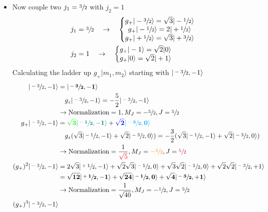\documentclass[../main.tex]{subfiles}
\begin{document}
\begin{itemize}
\item Now couple two $j_1=\sfrac{3}{2}$ with $j_2=1$
\begin{align}
j_1&=\sfrac{3}{2}\quad\rightarrow\quad\left\{\begin{matrix}
g_+|-\sfrac{3}{2}\rangle=\sqrt{3}|-\sfrac{1}{2}\rangle\\
g_+|-\sfrac{1}{2}\rangle=2|+\sfrac{1}{2}\rangle\\
g_+|+\sfrac{1}{2}\rangle=\sqrt{3}|+\sfrac{3}{2}\rangle
\end{matrix}\right.\\
j_2&=1\quad\rightarrow\quad\left\{\begin{matrix}
g_+|-1\rangle=\sqrt{2}|0\rangle\\
g_+|0\rangle=\sqrt{2}|+1\rangle\\
\end{matrix}\right.\\
\end{align}
Calculating the ladder up $g_+|m_1,m_2\rangle$ starting with $|\sfrac{-3}{2},-1\rangle$
\begin{align}
|\sfrac{-3}{2},-1\rangle 
&= \mathbf{|\sfrac{-3}{2},-1\rangle}\\
&\quad g_z|\sfrac{-3}{2},-1\rangle=-\frac{5}{2}|\sfrac{-3}{2},-1\rangle\\
&\rightarrow \text{Normalization}=1,M_J=-\sfrac{5}{2},J=\sfrac{5}{2}\\
%
g_+|\sfrac{-3}{2},-1\rangle 
&= \mathbf{\textcolor{green}{\sqrt{3}}\textcolor{teal}{|\sfrac{-1}{2},-1\rangle} +\textcolor{blue}{\sqrt{2}}\textcolor{cyan}{|\sfrac{-3}{2},0\rangle}}\\
&\quad g_z(\sqrt{3}|\sfrac{-1}{2},-1\rangle +\sqrt{2}|\sfrac{-3}{2},0\rangle)=-\frac{3}{2}(\sqrt{3}|\sfrac{-1}{2},-1\rangle +\sqrt{2}|\sfrac{-3}{2},0\rangle)\\
&\rightarrow \text{Normalization}=\frac{1}{\textcolor{red}{\sqrt{5}}},M_J=\textcolor{orange}{-\sfrac{3}{2}},J=\textcolor{purple}{\sfrac{5}{2}}\\
%
(g_+)^2|\sfrac{-3}{2},-1\rangle
&=2\sqrt{3}|\sfrac{+1}{2},-1\rangle+\sqrt{2}\sqrt{3}|\sfrac{-1}{2},0\rangle+\sqrt{3}\sqrt{2}|\sfrac{-1}{2},0\rangle+\sqrt{2}\sqrt{2}|\sfrac{-3}{2},+1\rangle\\
&=\mathbf{\sqrt{12}|\sfrac{+1}{2},-1\rangle +\sqrt{24}|\sfrac{-1}{2},0\rangle+\sqrt{4}|\sfrac{-3}{2},+1\rangle} \\
&\rightarrow \text{Normalization}=\frac{1}{\sqrt{40}}, M_J=-\sfrac{1}{2},J=\sfrac{5}{2}\\
%
(g_+)^3|\sfrac{-3}{2},-1\rangle

\end{align}
\end{itemize}
\end{document}
